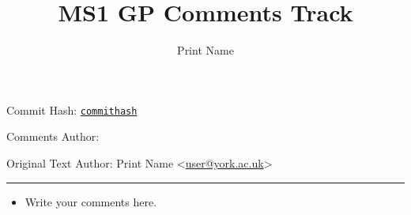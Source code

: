 \documentclass{article}
\author{Print Name \yorkemail{user}}
\title{MS1 GP Comments Track}
\makeatletter
\newcommand{\originalauthor}{Print Name \yorkemail{user}}
\newcommand{\commithashlong}{commithash}
\newcommand{\originaltexfile}{./file.tex}
\newcommand{\printoriginal}{%
        \clearpage
        \section*{Original Copy (Rendered)}
        \begin{linenumbers}
                
        \end{linenumbers}
        \section*{Original Copy (Source)}
        \inputminted{latex}{\originaltexfile}
}
\renewcommand{\headrulewidth}{.5pt}
\newcommand{\yorkemail}[1]{\textless\href{mailto:#1@york.ac.uk}%
        {#1@york.ac.uk}\textgreater}
\newcommand{\commitref}[1]{\href{https://github.com/oliverdixon/MS1GP/%
        commit/\commithashlong}{\texttt{#1}}}
\newcommand{\subtitle}{%
        \vspace{-.3\baselineskip}
        \begin{center}
                Commit Hash: \commitref{\commithashlong}
                \vspace{.3\baselineskip}

                Comments Author: \@author

                Original Text Author: \originalauthor
        \end{center}
        \vspace{2\baselineskip}
        \par\vspace{-2em}\noindent\rule{\textwidth}{\headrulewidth}\vspace{1em}
}
\makeatother
\begin{document}
\thispagestyle{title}
\pagestyle{fancy}
\makeatletter
\section*{\@title}
\makeatother
\subtitle
\begin{itemize}
        \item Write your comments here.
\end{itemize}
\end{document}
